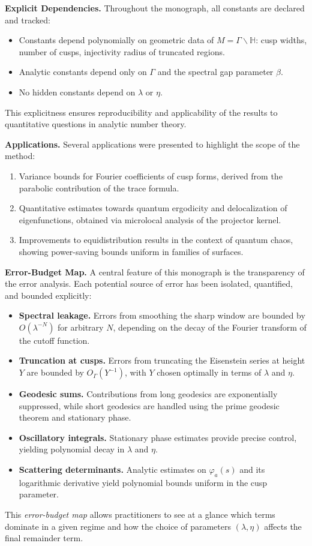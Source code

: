 \medskip
\noindent\textbf{Explicit Dependencies.}
Throughout the monograph, all constants are declared and tracked:
\begin{itemize}
  \item Constants depend polynomially on geometric data of $M=\Gamma\backslash\mathbb{H}$: cusp widths, number of cusps, injectivity radius of truncated regions.
  \item Analytic constants depend only on $\Gamma$ and the spectral gap parameter $\beta$.
  \item No hidden constants depend on $\lambda$ or $\eta$.
\end{itemize}
This explicitness ensures reproducibility and applicability of the results to quantitative questions in analytic number theory.

\medskip
\noindent\textbf{Applications.}
Several applications were presented to highlight the scope of the method:
\begin{enumerate}
  \item Variance bounds for Fourier coefficients of cusp forms, derived from the parabolic contribution of the trace formula.
  \item Quantitative estimates towards quantum ergodicity and delocalization of eigenfunctions, obtained via microlocal analysis of the projector kernel.
  \item Improvements to equidistribution results in the context of quantum chaos, showing power-saving bounds uniform in families of surfaces.
\end{enumerate}

\medskip
\noindent\textbf{Error-Budget Map.}
A central feature of this monograph is the transparency of the error analysis. Each potential source of error has been isolated, quantified, and bounded explicitly:
\begin{itemize}
  \item \textbf{Spectral leakage.} Errors from smoothing the sharp window are bounded by $O(\lambda^{-N})$ for arbitrary $N$, depending on the decay of the Fourier transform of the cutoff function.
  \item \textbf{Truncation at cusps.} Errors from truncating the Eisenstein series at height $Y$ are bounded by $O_\Gamma(Y^{-1})$, with $Y$ chosen optimally in terms of $\lambda$ and $\eta$.
  \item \textbf{Geodesic sums.} Contributions from long geodesics are exponentially suppressed, while short geodesics are handled using the prime geodesic theorem and stationary phase.
  \item \textbf{Oscillatory integrals.} Stationary phase estimates provide precise control, yielding polynomial decay in $\lambda$ and $\eta$.
  \item \textbf{Scattering determinants.} Analytic estimates on $\varphi_a(s)$ and its logarithmic derivative yield polynomial bounds uniform in the cusp parameter.
\end{itemize}
This \emph{error-budget map} allows practitioners to see at a glance which terms dominate in a given regime and how the choice of parameters $(\lambda,\eta)$ affects the final remainder term.

